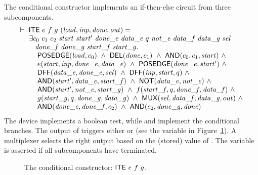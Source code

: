 \documentclass{llncs}
\begin{document}
The conditional constructor  implements an if-then-else
circuit from three subcomponents.
\[
\begin{array}{l}
\TURNST\ \DEF{ITE}\ e\ f\ g\ (\VAR{load,inp,done,out}) =\\
\phantom{\TURNST\ ~}
   \exists c_0~c_1~c_2~\VAR{start}~\VAR{start'}~\VAR{done\_e}~\VAR{data\_e}~q~ 
                          \VAR{not\_e}~\VAR{data\_f}~\VAR{data\_g}~\VAR{sel}\\
\phantom{\TURNST\ ~\exists }
                  \VAR{done\_f}~\VAR{done\_g}~
                          \VAR{start\_f}~\VAR{start\_g}.\ \\
\phantom{\TURNST\ ~\exists ~}
           \DEF{POSEDGE} (\VAR{load},c_0)\ \AND\
           \DEF{DEL} (\VAR{done},c_1)\ \AND\ \DEF{AND} (c_0,c_1,\VAR{start})\ \AND \\
\phantom{\TURNST\ ~\exists ~}
           e (\VAR{start},\VAR{inp},\VAR{done\_e},\VAR{data\_e})\ \AND\
           \DEF{POSEDGE} (\VAR{done\_e},\VAR{start'})\ \AND \\
\phantom{\TURNST\ ~\exists ~}
           \DEF{DFF} (\VAR{data\_e},\VAR{done\_e},\VAR{sel})\ \AND\
           \DEF{DFF} (\VAR{inp},\VAR{start},q)\ \AND \\
\phantom{\TURNST\ ~\exists ~}
           \DEF{AND} (\VAR{start'},\VAR{data\_e},\VAR{start\_f})\ \AND\
           \DEF{NOT} (\VAR{data\_e},\VAR{not\_e})\ \AND \\
\phantom{\TURNST\ ~\exists ~}
           \DEF{AND} (\VAR{start'},\VAR{not\_e},\VAR{start\_g})\ \AND\
           f (\VAR{start\_f},q,\VAR{done\_f},\VAR{data\_f})\ \AND\\
\phantom{\TURNST\ ~\exists ~}
           g (\VAR{start\_g},q,\VAR{done\_g},\VAR{data\_g})\ \AND\
           \DEF{MUX} (\VAR{sel},\VAR{data\_f},\VAR{data\_g},out)\ \AND \\
\phantom{\TURNST\ ~\exists ~}
           \DEF{AND} (\VAR{done\_e},\VAR{done\_f},c_2)\ \AND\
           \DEF{AND} (c_2,\VAR{done\_g},\VAR{done}) 
\end{array}
\]
The device \VAR{e} implements a boolean test, while
 and  implement the conditional branches.
The output of \VAR{e} triggers either \VAR{f} or \VAR{g}
(see the variable  in Figure~\ref{figIf}).
A multiplexer selects the right output based on the
(stored) value of \VAR{data\_e}.
The variable  is asserted if all subcomponents
have terminated.

\begin{figure}[htb]
   \centerline{}
   \caption{\label{figIf}The conditional constructor: $\DEF{ITE}\ e\ f\ g$.}
\end{figure}
\end{document}
